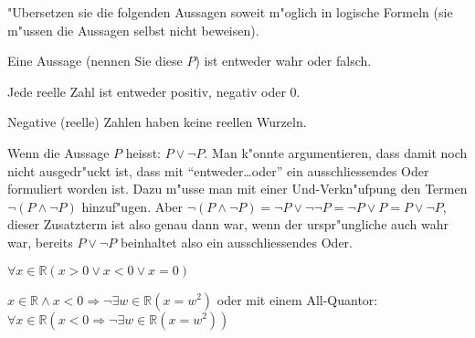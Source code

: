 "Ubersetzen sie die folgenden Aussagen soweit m"oglich in
logische Formeln (sie m"ussen die Aussagen selbst nicht beweisen).
\begin{teilaufgaben}
\item Eine Aussage (nennen Sie diese $P$) ist entweder wahr oder falsch.
\item Jede reelle Zahl ist entweder positiv, negativ oder $0$.
\item Negative (reelle) Zahlen haben keine reellen Wurzeln.
\end{teilaufgaben}

\begin{loesung}
\begin{teilaufgaben}
\item Wenn die Aussage $P$ heisst: $P\vee\neg P$.
Man k"onnte argumentieren, dass damit noch nicht ausgedr"uckt ist,
dass mit ``entweder\dots oder'' ein ausschliessendes Oder formuliert
worden ist. Dazu m"usse man mit einer Und-Verkn"ufpung den Termen
$\neg(P\wedge \neg P)$
hinzuf"ugen. Aber
$\neg(P\wedge \neg P)=\neg P\vee \neg\neg P=\neg P\vee P=P\vee\neg P$,
dieser Zusatzterm ist also genau dann war, wenn der urspr"ungliche
auch wahr war, bereits $P\vee \neg P$ beinhaltet also ein ausschliessendes
Oder.
\item $\forall x\in\mathbb R(x > 0\vee x<0\vee x=0)$
\item $x\in\mathbb R\wedge x < 0\Rightarrow
\neg\exists w\in\mathbb R(x=w^2)$
oder mit einem All-Quantor: $\forall x\in\mathbb R(x<0\Rightarrow
\neg\exists w\in\mathbb R(x=w^2))$
\end{teilaufgaben}
\end{loesung}


